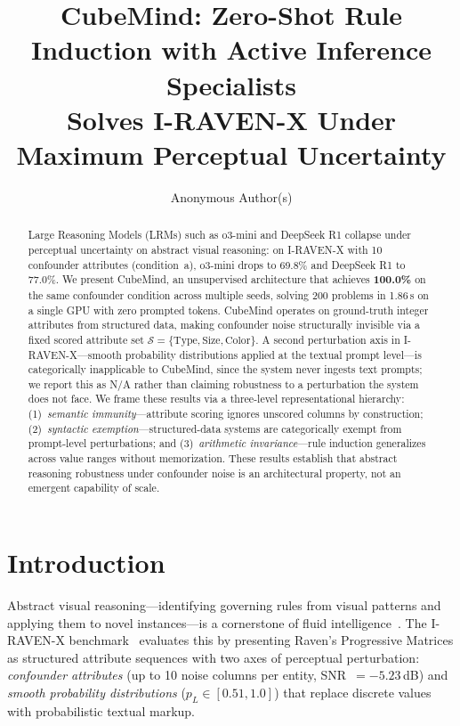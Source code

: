 \documentclass{article}
\title{CubeMind: Zero-Shot Rule Induction with Active Inference Specialists\\Solves I-RAVEN-X Under Maximum Perceptual Uncertainty}
\author{
  Anonymous Author(s)
}
\begin{document}
\maketitle

\begin{abstract}
Large Reasoning Models (LRMs) such as o3-mini and DeepSeek R1 collapse under perceptual uncertainty on abstract visual reasoning: on I-RAVEN-X with 10 confounder attributes (condition~a), o3-mini drops to 69.8\% and DeepSeek R1 to 77.0\%. We present CubeMind, an unsupervised architecture that achieves \textbf{100.0\%} on the same confounder condition across multiple seeds, solving 200 problems in 1.86\,s on a single GPU with zero prompted tokens. CubeMind operates on ground-truth integer attributes from structured data, making confounder noise structurally invisible via a fixed scored attribute set $\mathcal{S} = \{\text{Type}, \text{Size}, \text{Color}\}$. A second perturbation axis in I-RAVEN-X---smooth probability distributions applied at the textual prompt level---is categorically inapplicable to CubeMind, since the system never ingests text prompts; we report this as N/A rather than claiming robustness to a perturbation the system does not face. We frame these results via a three-level representational hierarchy: (1)~\emph{semantic immunity}---attribute scoring ignores unscored columns by construction; (2)~\emph{syntactic exemption}---structured-data systems are categorically exempt from prompt-level perturbations; and (3)~\emph{arithmetic invariance}---rule induction generalizes across value ranges without memorization. These results establish that abstract reasoning robustness under confounder noise is an architectural property, not an emergent capability of scale.
\end{abstract}

\section{Introduction}

Abstract visual reasoning---identifying governing rules from visual patterns and applying them to novel instances---is a cornerstone of fluid intelligence~\cite{raven1938}. The I-RAVEN-X benchmark~\cite{sicking2026iravenx} evaluates this by presenting Raven's Progressive Matrices as structured attribute sequences with two axes of perceptual perturbation: \emph{confounder attributes} (up to 10 noise columns per entity, SNR~$= -5.23$\,dB) and \emph{smooth probability distributions} ($p_L \in [0.51, 1.0]$) that replace discrete values with probabilistic textual markup.
\end{document}
